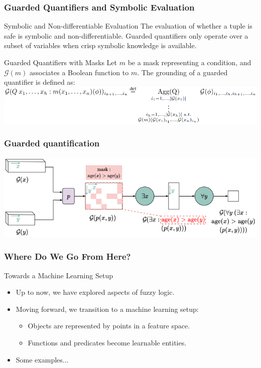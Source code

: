\documentclass{beamer}
\newcommand{\G}{\mathcal{G}}
\begin{document}
\begin{frame}
\frametitle{Guarded Quantifiers and Symbolic Evaluation}
\begin{block}{Symbolic and Non-differentiable Evaluation}
The evaluation of whether a tuple is safe is symbolic and non-differentiable. Guarded quantifiers only operate over a subset of variables when crisp symbolic knowledge is available.
\end{block}

\begin{block}{Guarded Quantifiers with Masks}
Let \( m \) be a mask representing a condition, and \( \G(m) \) associates a Boolean function to \( m \). The grounding of a guarded quantifier is defined as:
\includegraphics[width=\textwidth]{ltn5.png}
\end{block}
\end{frame}

\begin{frame}
  \frametitle{Guarded quantification}
  \includegraphics[width=\textwidth]{ltn6.png}
\end{frame}

\begin{frame}
\frametitle{Where Do We Go From Here?}
\begin{block}{Towards a Machine Learning Setup}
\begin{itemize}
    \item Up to now, we have explored aspects of fuzzy logic.
    \item Moving forward, we transition to a machine learning setup:
    \begin{itemize}
        \item Objects are represented by points in a feature space.
        \item Functions and predicates become learnable entities.
    \end{itemize}
    \item Some examples...
\end{itemize}
\end{block}
\end{frame}
\end{document}

